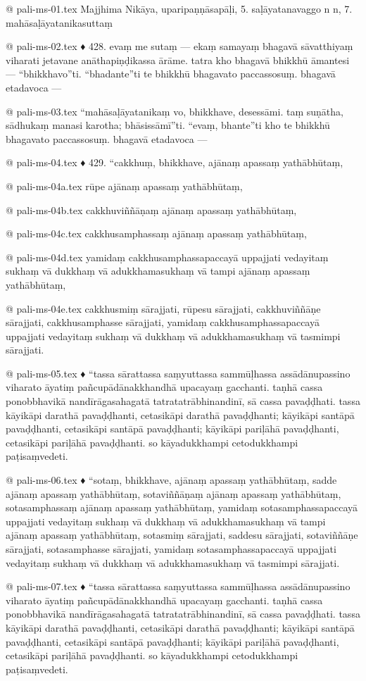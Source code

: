 @ pali-ms-01.tex
Majjhima Nikāya, uparipaṇṇāsapāḷi, 5. saḷāyatanavaggo n n, 7.
mahāsaḷāyatanikasuttaṃ

@ pali-ms-02.tex
♦ 428. evaṃ me sutaṃ — ekaṃ samayaṃ bhagavā sāvatthiyaṃ viharati jetavane anāthapiṇḍikassa ārāme. tatra kho bhagavā bhikkhū āmantesi — “bhikkhavo”ti. “bhadante”ti te bhikkhū bhagavato paccassosuṃ. bhagavā etadavoca —

@ pali-ms-03.tex
“mahāsaḷāyatanikaṃ vo, bhikkhave, desessāmi. taṃ suṇātha, sādhukaṃ manasi karotha; bhāsissāmī”ti. “evaṃ, bhante”ti kho te bhikkhū bhagavato paccassosuṃ. bhagavā etadavoca —

@ pali-ms-04.tex
♦ 429. “cakkhuṃ, bhikkhave, ajānaṃ apassaṃ yathābhūtaṃ,

@ pali-ms-04a.tex
rūpe ajānaṃ apassaṃ yathābhūtaṃ,

@ pali-ms-04b.tex
cakkhuviññāṇaṃ ajānaṃ apassaṃ yathābhūtaṃ,

@ pali-ms-04c.tex
cakkhusamphassaṃ ajānaṃ apassaṃ yathābhūtaṃ,

@ pali-ms-04d.tex
yamidaṃ cakkhusamphassapaccayā uppajjati vedayitaṃ sukhaṃ vā dukkhaṃ vā adukkhamasukhaṃ vā tampi ajānaṃ apassaṃ yathābhūtaṃ,

@ pali-ms-04e.tex
cakkhusmiṃ sārajjati, rūpesu sārajjati, cakkhuviññāṇe sārajjati, cakkhusamphasse sārajjati, yamidaṃ cakkhusamphassapaccayā uppajjati vedayitaṃ sukhaṃ vā dukkhaṃ vā adukkhamasukhaṃ vā tasmimpi sārajjati.

@ pali-ms-05.tex
♦ “tassa sārattassa saṃyuttassa sammūḷhassa assādānupassino viharato āyatiṃ pañcupādānakkhandhā upacayaṃ gacchanti. taṇhā cassa ponobbhavikā nandīrāgasahagatā tatratatrābhinandinī, sā cassa pavaḍḍhati. tassa kāyikāpi darathā pavaḍḍhanti, cetasikāpi darathā pavaḍḍhanti; kāyikāpi santāpā pavaḍḍhanti, cetasikāpi santāpā pavaḍḍhanti; kāyikāpi pariḷāhā pavaḍḍhanti, cetasikāpi pariḷāhā pavaḍḍhanti. so kāyadukkhampi cetodukkhampi paṭisaṃvedeti.

@ pali-ms-06.tex
♦ “sotaṃ, bhikkhave, ajānaṃ apassaṃ yathābhūtaṃ, sadde ajānaṃ apassaṃ yathābhūtaṃ, sotaviññāṇaṃ ajānaṃ apassaṃ yathābhūtaṃ, sotasamphassaṃ ajānaṃ apassaṃ yathābhūtaṃ, yamidaṃ sotasamphassapaccayā uppajjati vedayitaṃ sukhaṃ vā dukkhaṃ vā adukkhamasukhaṃ vā tampi ajānaṃ apassaṃ yathābhūtaṃ, sotasmiṃ sārajjati, saddesu sārajjati, sotaviññāṇe sārajjati, sotasamphasse sārajjati, yamidaṃ sotasamphassapaccayā uppajjati vedayitaṃ sukhaṃ vā dukkhaṃ vā adukkhamasukhaṃ vā tasmimpi sārajjati.

@ pali-ms-07.tex
♦ “tassa sārattassa saṃyuttassa sammūḷhassa assādānupassino viharato āyatiṃ pañcupādānakkhandhā upacayaṃ gacchanti. taṇhā cassa ponobbhavikā nandīrāgasahagatā tatratatrābhinandinī, sā cassa pavaḍḍhati. tassa kāyikāpi darathā pavaḍḍhanti, cetasikāpi darathā pavaḍḍhanti; kāyikāpi santāpā pavaḍḍhanti, cetasikāpi santāpā pavaḍḍhanti; kāyikāpi pariḷāhā pavaḍḍhanti, cetasikāpi pariḷāhā pavaḍḍhanti. so kāyadukkhampi cetodukkhampi paṭisaṃvedeti.

